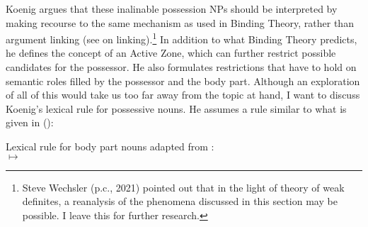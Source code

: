\documentclass[output=paper,biblatex,babelshorthands,newtxmath,draftmode,colorlinks,citecolor=brown]{langscibook}
\begin{document}
Koenig argues that these inalinable possession NPs should be interpreted by making recourse to the
same mechanism as used in Binding Theory, rather than argument linking (see
 on linking).\footnote{\label{fn-non-configurational-BT-SW}%
Steve Wechsler (p.c., 2021) pointed out that in the light of  theory
of weak definites, a reanalysis of the phenomena discussed in this section may be possible. I leave this for further research.
} In addition to what Binding
Theory predicts, he defines the concept of an Active Zone, which can further restrict possible
candidates for the possessor. He also formulates restrictions that have to hold on semantic roles
filled by the possessor and the body part. Although an exploration of all of this would take us too far
away from the topic at hand, I want to discuss Koenig's lexical rule for possessive nouns. He assumes a rule
similar to what is given in ():

\ea
Lexical rule for body part nouns adapted from \citet[256]{Koenig1999b}:\\
 $\mapsto$\\
\flushright
{}

\medskip
\z
\end{document}
